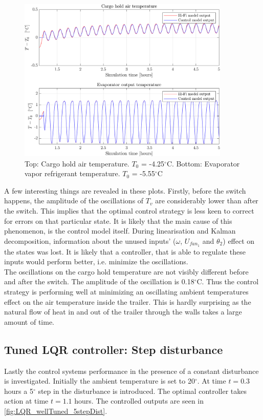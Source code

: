 \begin{figure}[h!]
	\centering
	\includegraphics[width=0.9\textwidth]{Graphics/fig_LQR_wellTuned_sineDist_zoom.png}
	\caption{Top: Cargo hold air temperature. $T_0$ = -4.25$^{\circ}$C. Bottom: Evaporator vapor refrigerant temperature. $T_0$ = -5.55$^{\circ}$C}
	\label{fig:LQR_wellTuned_sineDist_zoom}
\end{figure}

A few interesting things are revealed in these plots. Firstly, before the switch happens, the amplitude of the oscillations of $T_v$ are considerably lower than after the switch. This implies that the optimal control strategy is less keen to correct for errors on that particular state. It is likely that the main cause of this phenomenon, is the control model itself. During linearisation and Kalman decomposition, information about the unused inputs' ($\omega$, $U_{fan_1}$ and $\theta_2$) effect on the states was lost. It is likely that a controller, that is able to regulate these inputs would perform better, i.e. minimize the oscillations.\\

The oscillations on the cargo hold temperature are not visibly different before and after the switch. The amplitude of the oscillation is 0.18$^{\circ}$C. Thus the control strategy is performing well at minimizing an oscillating ambient temperatures effect on the air temperature inside the trailer. This is hardly surprising as the natural flow of heat in and out of the trailer through the walls takes a large amount of time. \\


\newpage
\subsection{Tuned LQR controller: Step disturbance}
Lastly the control systems performance in the presence of a constant disturbance is investigated. Initially the ambient temperature is set to 20$^{\circ}$. At time $t=0.3$ hours a 5$^{\circ}$ step in the disturbance is introduced. The optimal controller takes action at time $t=1.1$ hours. The controlled outputs are seen in \cref{fig:LQR_wellTuned_5stepDist}.\\

